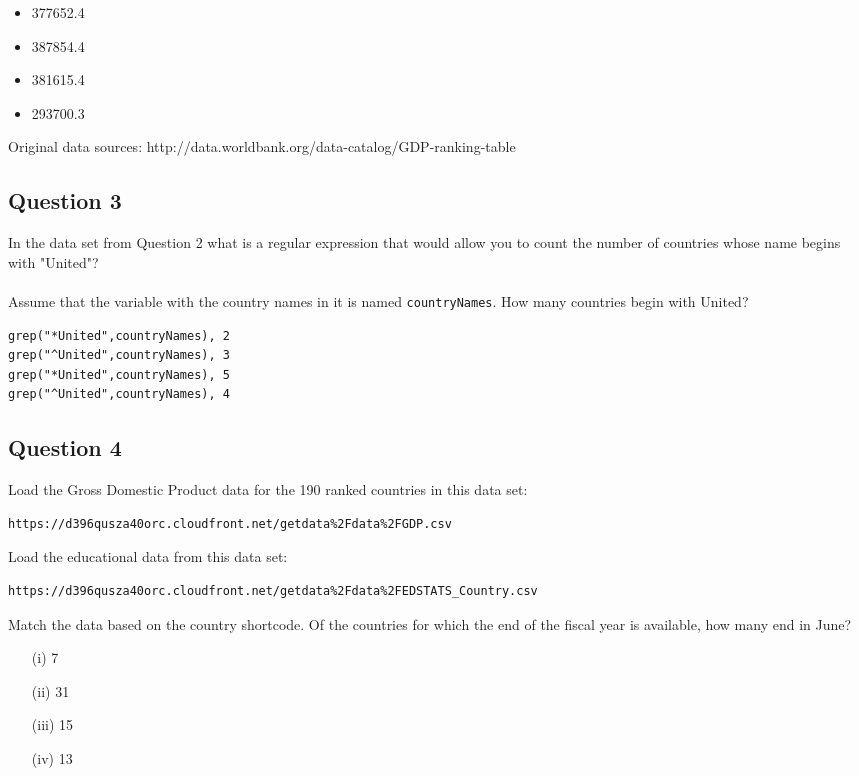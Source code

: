 \documentclass[]{article}
\begin{document}
\begin{itemize}
\item 377652.4
\item 387854.4
\item 381615.4
\item 293700.3
\end{itemize}

Original data sources: http://data.worldbank.org/data-catalog/GDP-ranking-table
\newpage
\subsection*{Question 3}
In the data set from Question 2 what is a regular expression that would allow you to count the number of countries whose name begins with "United"? \\ \\ Assume that the variable with the country names in it is named \texttt{countryNames}. How many countries begin with United?
\begin{verbatim}
grep("*United",countryNames), 2
grep("^United",countryNames), 3
grep("*United",countryNames), 5
grep("^United",countryNames), 4
\end{verbatim}
\newpage
\subsection*{Question 4}
Load the Gross Domestic Product data for the 190 ranked countries in this data set: 

\begin{verbatim}
https://d396qusza40orc.cloudfront.net/getdata%2Fdata%2FGDP.csv 
\end{verbatim}
Load the educational data from this data set: 

\begin{verbatim}
https://d396qusza40orc.cloudfront.net/getdata%2Fdata%2FEDSTATS_Country.csv 
\end{verbatim}
Match the data based on the country shortcode. Of the countries for which the end of the fiscal year is available, how many end in June? 

\begin{itemize}
\item[(i)] 7
\item[(ii)] 31
\item[(iii)] 15
\item[(iv)] 13
\end{itemize}
\end{document}
